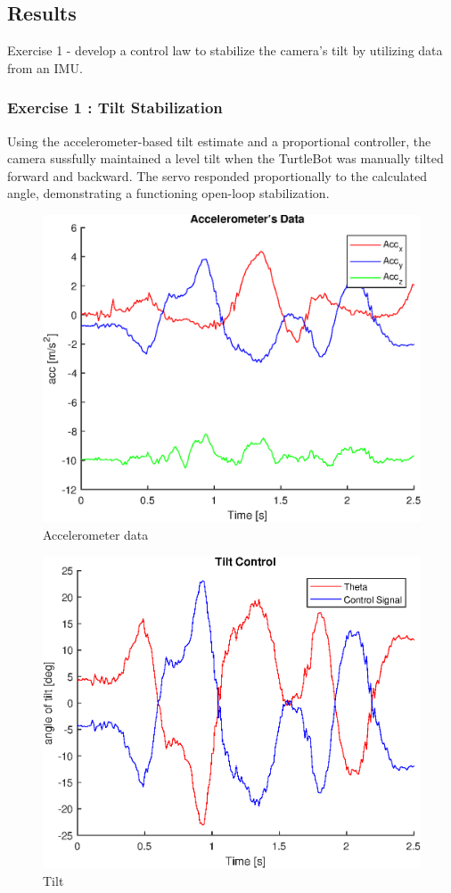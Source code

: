 \subsection{Results}

Exercise 1 - develop a control law to stabilize the camera's tilt by utilizing data from an IMU.

\subsubsection{Exercise 1 : Tilt Stabilization}

Using the accelerometer-based tilt estimate and a proportional controller, the camera sussfully maintained a level tilt when the TurtleBot was manually tilted forward and backward. The servo responded proportionally to the calculated angle, demonstrating a functioning open-loop stabilization.


\begin{figure}[H]
    \centering
    \includegraphics[width=0.5\linewidth]{lab1-2/figures/Accelerometer_Data.eps}
    \caption{Accelerometer data}
    \label{fig:acc_data}
\end{figure}

\begin{figure}[H]
    \centering
    \includegraphics[width=0.5\linewidth]{lab1-2/figures/Tilt.eps}
    \caption{Tilt}
    \label{fig:tilt}
\end{figure}



